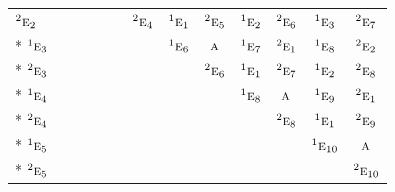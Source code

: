 \documentclass[10pt,a4paper]{article}
\numberwithin{equation}{section}
\newcommand{\irr}[1]{\text{\normalfont\scshape #1}}
\newcommand{\conjpair}[1]{{}^{#1}}
\begin{document}
{\begin{longtable}{@{}lcccccccccccc@{}}
$\conjpair{2}\irr{e}_{2}$ &  &  &  &  &  & $\conjpair{2}\irr{e}_{4}$ & $\conjpair{1}\irr{e}_{1}$ & $\conjpair{2}\irr{e}_{5}$ & $\conjpair{1}\irr{e}_{2}$ & $\conjpair{2}\irr{e}_{6}$ & $\conjpair{1}\irr{e}_{3}$ & $\conjpair{2}\irr{e}_{7}$\\*
$\conjpair{1}\irr{e}_{3}$ &  &  &  &  &  &  & $\conjpair{1}\irr{e}_{6}$ & $\irr{a}$ & $\conjpair{1}\irr{e}_{7}$ & $\conjpair{2}\irr{e}_{1}$ & $\conjpair{1}\irr{e}_{8}$ & $\conjpair{2}\irr{e}_{2}$\\*
$\conjpair{2}\irr{e}_{3}$ &  &  &  &  &  &  &  & $\conjpair{2}\irr{e}_{6}$ & $\conjpair{1}\irr{e}_{1}$ & $\conjpair{2}\irr{e}_{7}$ & $\conjpair{1}\irr{e}_{2}$ & $\conjpair{2}\irr{e}_{8}$\\*
$\conjpair{1}\irr{e}_{4}$ &  &  &  &  &  &  &  &  & $\conjpair{1}\irr{e}_{8}$ & $\irr{a}$ & $\conjpair{1}\irr{e}_{9}$ & $\conjpair{2}\irr{e}_{1}$\\*
$\conjpair{2}\irr{e}_{4}$ &  &  &  &  &  &  &  &  &  & $\conjpair{2}\irr{e}_{8}$ & $\conjpair{1}\irr{e}_{1}$ & $\conjpair{2}\irr{e}_{9}$\\*
$\conjpair{1}\irr{e}_{5}$ &  &  &  &  &  &  &  &  &  &  & $\conjpair{1}\irr{e}_{10}$ & $\irr{a}$\\*
$\conjpair{2}\irr{e}_{5}$ &  &  &  &  &  &  &  &  &  &  &  & $\conjpair{2}\irr{e}_{10}$\\
\bottomrule\end{longtable}}
\end{document}
